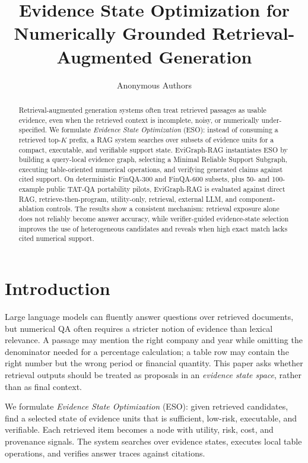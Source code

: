 \documentclass[letterpaper]{article}
\title{Evidence State Optimization for Numerically Grounded Retrieval-Augmented Generation}
\author{
Anonymous Authors
}
\begin{document}
\maketitle

\begin{abstract}
Retrieval-augmented generation systems often treat retrieved passages as usable evidence, even when the retrieved context is incomplete, noisy, or numerically under-specified.
We formulate \emph{Evidence State Optimization} (ESO): instead of consuming a retrieved top-\(K\) prefix, a RAG system searches over subsets of evidence units for a compact, executable, and verifiable support state.
EviGraph-RAG instantiates ESO by building a query-local evidence graph, selecting a Minimal Reliable Support Subgraph, executing table-oriented numerical operations, and verifying generated claims against cited support.
On deterministic FinQA-300 and FinQA-600 subsets, plus 50- and 100-example public TAT-QA portability pilots, EviGraph-RAG is evaluated against direct RAG, retrieve-then-program, utility-only, retrieval, external LLM, and component-ablation controls.
The results show a consistent mechanism: retrieval exposure alone does not reliably become answer accuracy, while verifier-guided evidence-state selection improves the use of heterogeneous candidates and reveals when high exact match lacks cited numerical support.
\end{abstract}

\section{Introduction}

Large language models can fluently answer questions over retrieved documents, but numerical QA often requires a stricter notion of evidence than lexical relevance.
A passage may mention the right company and year while omitting the denominator needed for a percentage calculation; a table row may contain the right number but the wrong period or financial quantity.
This paper asks whether retrieval outputs should be treated as proposals in an \emph{evidence state space}, rather than as final context.

We formulate \emph{Evidence State Optimization} (ESO): given retrieved candidates, find a selected state of evidence units that is sufficient, low-risk, executable, and verifiable.
Each retrieved item becomes a node with utility, risk, cost, and provenance signals.
The system searches over evidence states, executes local table operations, and verifies answer traces against citations.
\end{document}
